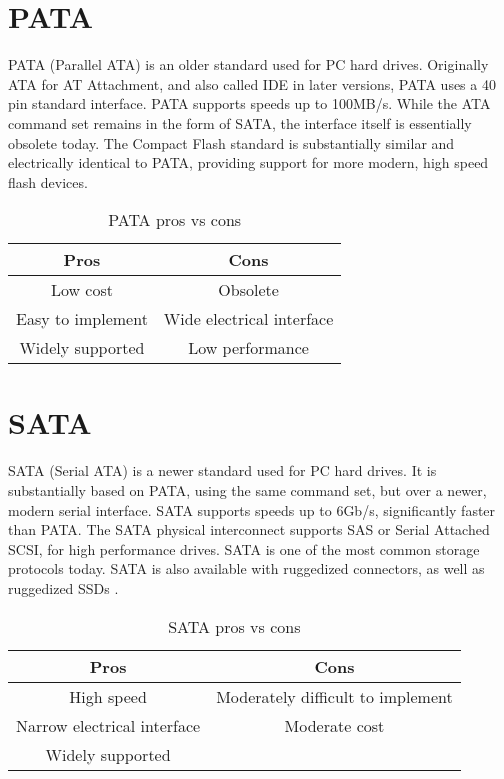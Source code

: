 \documentclass[12pt,article]{memoir}
\begin{document}
\section{PATA}
PATA (Parallel ATA) is an older standard used for PC hard drives. Originally ATA for AT Attachment, and also called IDE in later versions, PATA uses a 40 pin standard interface. PATA supports speeds up to 100MB/s. While the ATA command set remains in the form of SATA, the interface itself is essentially obsolete today. \cite{wiki:pata} The Compact Flash standard is substantially similar and electrically identical to PATA, providing support for more modern, high speed flash devices. \cite{wiki:compactflash}
\begin{table}[H]
	\centering
	\begin{tabu}{c | c}
		Pros & Cons \\ \hline
		Low cost & Obsolete\\
		Easy to implement & Wide electrical interface\\
		Widely supported & Low performance
	\end{tabu}
	\caption{PATA pros vs cons}
\end{table}

\section{SATA}
SATA (Serial ATA) is a newer standard used for PC hard drives. It is substantially based on PATA, using the same command set, but over a newer, modern serial interface. SATA supports speeds up to 6Gb/s, significantly faster than PATA. The SATA physical interconnect supports SAS or Serial Attached SCSI, for high performance drives. SATA is one of the most common storage protocols today. \cite{wiki:sata} SATA is also available with ruggedized connectors, as well as ruggedized SSDs \cite{microsemi:rsata} \cite{amphenol:rsata}.
\begin{table}[H]
	\centering
	\begin{tabu}{c | c}
		Pros & Cons \\ \hline
		High speed & Moderately difficult to implement\\
		Narrow electrical interface & Moderate cost\\
		Widely supported & \\
	\end{tabu}
	\caption{SATA pros vs cons}
\end{table}
\end{document}
